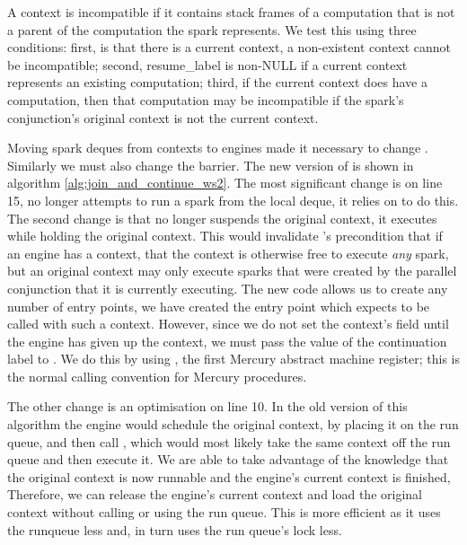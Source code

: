 A context is incompatible if it contains stack frames of a computation that
is not a parent of the computation the spark represents.
We test this using three conditions:
first, is that there is a current context, a non-existent context cannot
be incompatible;
second, resume\_label is non-NULL if a current context represents an
existing computation;
third, if the current context does have a computation, then that computation
may be incompatible if the spark's conjunction's original context is not the
current context.

Moving spark deques from contexts to engines made it necessary to change
\idle.
Similarly we must also change the \joinandcontinue barrier.
The new version of \joinandcontinue is shown in algorithm
\ref{alg:join_and_continue_ws2}.
The most significant change is on line 15,
\joinandcontinue no longer attempts to run a spark from the local deque,
it relies on \idle to do this.
The second change is that \joinandcontinue no longer suspends the original
context, it executes \idle while holding the original context.
This would invalidate \idle's precondition that if an engine has a context,
that the context is otherwise free to execute \emph{any} spark,
but an original context may only execute sparks that were created by the
parallel conjunction that it is currently executing.
The new \idle code allows us to create any number of entry points,
we have created the \idleorigcontext entry point which expects to be called
with such a context.
However, since we do not set the context's  field until
the engine has given up the context,
we must pass the value of the continuation label to \idleorigcontext.
We do this by using , the first Mercury abstract machine
register;
this is the normal calling convention for Mercury procedures.

The other change is an optimisation on line 10.
In the old version of this algorithm the engine would schedule the original
context,
by placing it on the run queue,
and then call \idle,
which would most likely take the same context off the run queue and then
execute it.
We are able to take advantage of the knowledge that the original context is
now runnable and the engine's current context is finished,
Therefore, we can release the engine's current context and load the original
context without calling \idle or using the run queue.
This is more efficient as it uses the runqueue less and,
in turn uses the run queue's lock less.


